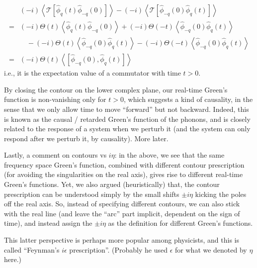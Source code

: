 \begin{align*}
    &\left( -i \right) \left< \mathcal{T} \left[ \hat{\phi}_q\left( t \right) \hat{\phi}_{-q}\left( 0 \right) \right] \right> -\left( -i \right) \left< \mathcal{T} \left[ \hat{\phi}_{-q}\left( 0 \right) \hat{\phi}_q\left( t \right) \right] \right> \\
    =&\left( -i \right) \Theta \left( t \right) \left< \hat{\phi}_q\left( t \right) \hat{\phi}_{-q}\left( 0 \right) \right> +\left( -i \right) \Theta \left( -t \right) \left< \hat{\phi}_{-q}\left( 0 \right) \hat{\phi}_q\left( t \right) \right> \\
    &\quad -\left( -i \right) \Theta \left( t \right) \left< \hat{\phi}_{-q}\left( 0 \right) \hat{\phi}_q\left( t \right) \right> -\left( -i \right) \Theta \left( -t \right) \left< \hat{\phi}_{-q}\left( 0 \right) \hat{\phi}_q\left( t \right) \right> \\
    =&\left( -i \right) \Theta \left( t \right) \left< \left[ \hat{\phi}_{-q}\left( 0 \right) ,\hat{\phi}_q\left( t \right) \right] \right>
\end{align*}
i.e., it is the expectation value of a commutator with time $t>0$.

By closing the contour on the lower complex plane, our real-time Green's function is non-vanishing only for $t>0$, which suggests a kind of causality, in the sense that we only allow time to move ``forward'' but not backward. Indeed, this is known as the causal / retarded Green's function of the phonons, and is closely related to the response of a system when we perturb it (and the system can only respond after we perturb it, by causality). More later.

Lastly, a comment on contours vs $i\eta$: in the above, we see that the same frequency space Green's function, combined with different contour prescription (for avoiding the singularities on the real axis), gives rise to different real-time Green's functions. Yet, we also argued (heuristically) that, the contour prescription can be understood simply by the small shifts $\pm i\eta$ kicking the poles off the real axis. So, instead of specifying different contours, we can also stick with the real line (and leave the ``arc'' part implicit, dependent on the sign of time), and instead assign the $\pm i\eta$ as the definition for different Green's functions.

This latter perspective is perhaps more popular among physicists, and this is called ``Feynman's $i\epsilon$ prescription''. (Probably he used $\epsilon$ for what we denoted by $\eta$ here.)

